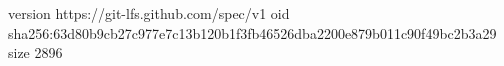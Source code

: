 version https://git-lfs.github.com/spec/v1
oid sha256:63d80b9cb27c977e7c13b120b1f3fb46526dba2200e879b011c90f49bc2b3a29
size 2896
